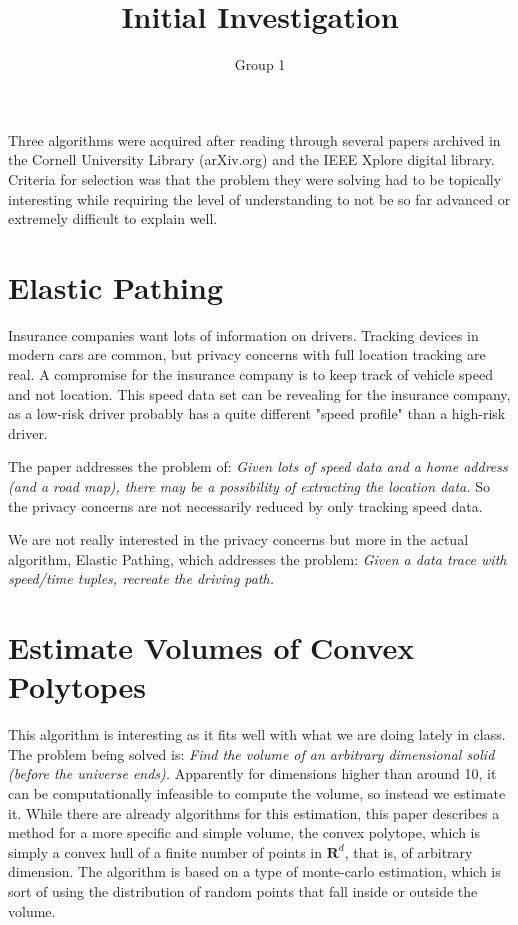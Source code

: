 \documentclass[11pt]{article}
\title{Initial Investigation}
\author{Group 1}
\begin{document}
\maketitle

Three algorithms were acquired after reading through several papers archived in the Cornell University Library (arXiv.org) and the IEEE Xplore digital library. Criteria for selection was that the problem they were solving had to be topically interesting while requiring the level of understanding to not be so far advanced or extremely difficult to explain well.  

\section{Elastic Pathing\cite{Firner}}
Insurance companies want lots of information on drivers. Tracking devices in modern cars are common, but privacy concerns with full location tracking are real. A compromise for the insurance company is to keep track of vehicle speed and not location. This speed data set can be revealing for the insurance company, as a low-risk driver probably has a quite different "speed profile" than a high-risk driver.

The paper addresses the problem of:  {\em Given lots of speed data and a home address (and a road map), there may be a possibility of extracting the location data.}  So the privacy concerns are not necessarily reduced by only tracking speed data.

We are not really interested in the privacy concerns but more in the actual algorithm, Elastic Pathing, which addresses the problem:
{\em Given a data trace with speed/time tuples, recreate the driving path.}

\section{Estimate Volumes of Convex Polytopes\cite{Ge}}
This algorithm is interesting as it fits well with what we are doing lately in class. The problem being solved is:  {\em Find the volume of an arbitrary dimensional solid (before the universe ends).}  Apparently for dimensions higher than around 10, it can be computationally infeasible to compute the volume, so instead we estimate it. While there are already algorithms for this estimation, this paper describes a method for a more specific and simple volume, the convex polytope, which is simply a convex hull of a finite number of points in $\mathbf{R}^d$, that is, of arbitrary dimension.
The algorithm is based on a type of monte-carlo estimation, which is sort of using the distribution of random points that fall inside or outside the volume.
\end{document}
